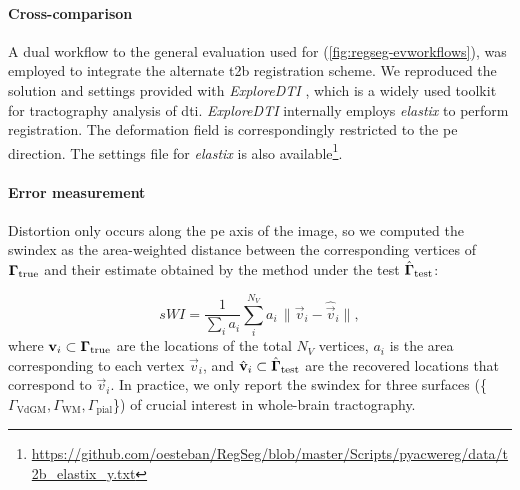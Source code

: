 \paragraph*{Cross-comparison} %
A dual workflow to the general evaluation used for \regseg{} (\autoref{fig:regseg-evworkflows}),
  was employed to integrate the alternate \gls*{t2b} registration scheme.
We reproduced the solution and settings provided with \emph{ExploreDTI}
  \citep{leemans_exploredti_2009}, which is a widely used toolkit for tractography analysis of
  \gls*{dti}.
\emph{ExploreDTI} internally employs \emph{elastix} \citep{klein_elastix_2010} to
  perform registration.
The deformation field is correspondingly restricted to the \gls*{pe} direction.
The settings file for \emph{elastix} is also
  available\footnote{\url{https://github.com/oesteban/RegSeg/blob/master/Scripts/pyacwereg/data/t2b_elastix_y.txt}}.


\paragraph*{Error measurement}\label{sec:regseg-experiments_evaluation}
Distortion only occurs along the \gls*{pe} axis of the image, so we computed the
  \gls*{swindex} as the area-weighted distance between the corresponding vertices of
  $\boldsymbol{\Gamma}_\text{true}$ and their estimate obtained by the method under the test $\hat{\boldsymbol{\Gamma}}_\text{test}$:

  \begin{equation}
  sWI = \frac{1}{\sum_i a_i} \sum\limits_i^{N_V} a_i\,\|
  \vec{v}_i - \hat{\vec{v}}_i \|,
  \label{eq:regseg-swindex}
  \end{equation}
  where $\mathbf{v}_i \subset \boldsymbol{\Gamma}_\text{true}$ are the locations of the total $N_V$ vertices,
  $a_i$ is the area corresponding to each vertex $\vec{v}_i$,
  and $\hat{\mathbf{v}}_i \subset \hat{\boldsymbol{\Gamma}}_\text{test}$ are the recovered locations
  that correspond to $\vec{v}_i$.
In practice, we only report the \gls*{swindex} for three surfaces (\{$\Gamma_\text{VdGM}, \Gamma_\text{WM}, \Gamma_\text{pial}$\})
  of crucial interest in whole-brain tractography.
